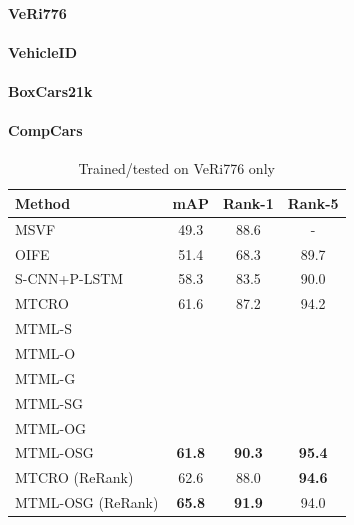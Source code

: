 \documentclass[10pt,twocolumn,letterpaper]{article}
\begin{document}
\paragraph{VeRi776}

\paragraph{VehicleID}

\paragraph{BoxCars21k}

\paragraph{CompCars}

\begin{table}
  \centering
  \begin{tabular}{l || c | c | c }
    \hline
    Method & mAP & Rank-1 & Rank-5 \\
    \hline
    MSVF \cite{kanaci2018vehicle} & 49.3 & 88.6 & - \\
    OIFE \cite{wang2017orientation} & 51.4 & 68.3 & 89.7 \\
    S-CNN+P-LSTM \cite{Shen_2017_ICCV} & 58.3 & 83.5 & 90.0 \\
    MTCRO \cite{xu2018framework} & 61.6 & 87.2 & 94.2 \\
    \hline
    MTML-S & \\
    MTML-O & \\
    MTML-G & \\
    MTML-SG & \\
    MTML-OG & \\
    MTML-OSG & \bf{61.8} & \bf{90.3} & \bf{95.4} \\
    \hline
    MTCRO (ReRank) \cite{xu2018framework} & 62.6 & 88.0 & \bf{94.6} \\
    MTML-OSG (ReRank) & \bf{65.8} & \bf{91.9} & 94.0 \\
    \hline
  \end{tabular}
  \caption{Trained/tested on VeRi776 only}
  \label{T:benchmark_results_veri}
\end{table}
\end{document}
